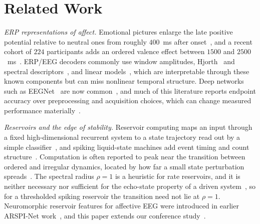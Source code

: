 \documentclass[journal]{IEEEtran}
\begin{document}
\section{Related Work}
\label{sec:related}
\emph{ERP representations of affect.} Emotional pictures enlarge the late positive potential relative to neutral ones from roughly $400$~ms after onset~\cite{cuthbert2000brain,schupp2006emotion,hajcak2010erp}, and a recent cohort of $224$ participants adds an ordered valence effect between $1500$ and $2500$~ms~\cite{revers2025dissociating}. ERP/EEG decoders commonly use window amplitudes, Hjorth~\cite{hjorth1970eeg} and spectral descriptors~\cite{subasi2007eeg}, and linear models~\cite{blankertz2011singletrial,grootswagers2017decoding}, which are interpretable through these known components but can miss nonlinear temporal structure. Deep networks such as EEGNet~\cite{lawhern2018eegnet} are now common~\cite{craik2019deep,roy2019deep}, and much of this literature reports endpoint accuracy over preprocessing and acquisition choices, which can change measured performance materially~\cite{delpup2025preprocessing,chiang2023depression,guo2025mma}.

\emph{Reservoirs and the edge of stability.} Reservoir computing maps an input through a fixed high-dimensional recurrent system to a state trajectory read out by a simple classifier~\cite{maass2002real,jaeger2001echo,jaeger2004harnessing,lukosevicius2009reservoir}, and spiking liquid-state machines add event timing and count structure~\cite{diehl2015unsupervised,roy2019towards}. Computation is often reported to peak near the transition between ordered and irregular dynamics, located by how far a small state perturbation spreads~\cite{bertschinger2004realtime,legenstein2007edge,boedecker2012information}. The spectral radius $\rho=1$ is a heuristic for rate reservoirs, and it is neither necessary nor sufficient for the echo-state property of a driven system~\cite{yildiz2012revisiting}, so for a thresholded spiking reservoir the transition need not lie at $\rho=1$. Neuromorphic reservoir features for affective EEG were introduced in earlier ARSPI-Net work~\cite{lane2023arspi,lane2024arspi}, and this paper extends our conference study~\cite{lane2026edge}.
\end{document}
